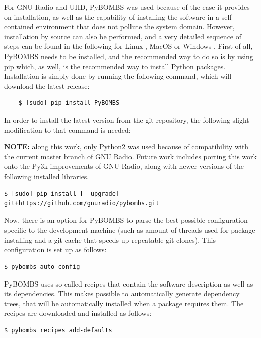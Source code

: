 For GNU Radio and \ac{UHD}, \ac{PyBOMBS} was used because of the ease it provides on installation, as well as the capability of installing the software in a self-contained environment that does not pollute the system domain. However, installation by source can also be performed, and a very detailed sequence of steps can be found in the following for Linux \cite{Linux}, MacOS \cite{OSX} or Windows \cite{Windows}. First of all, \ac{PyBOMBS} needs to be installed, and the recommended way to do so is by using \ac{pip} which, as well, is the recommended way to install Python packages.  Installation is simply done by running the following command, which will download the latest release:

\begin{lstlisting}
    $ [sudo] pip install PyBOMBS
\end{lstlisting}

In order to install the latest version from the git repository, the following slight modification to that command is needed:

\textbf{NOTE:} along this work, only Python2 was used because of compatibility with the current master branch of GNU Radio. Future work includes porting this work onto the Py3k improvements of GNU Radio, along with newer versions of the following installed libraries.

\begin{lstlisting}[breaklines=true]
    $ [sudo] pip install [--upgrade] git+https://github.com/gnuradio/pybombs.git
\end{lstlisting}

Now, there is an option for \ac{PyBOMBS} to parse the best possible configuration specific to the development machine (such as amount of threads used for package installing and a git-cache that speeds up repeatable git clones). This configuration is set up as follows:

\begin{lstlisting}[breaklines=true]
    $ pybombs auto-config
\end{lstlisting}

\ac{PyBOMBS} uses so-called recipes that contain the software description as well as its dependencies. This makes possible to automatically generate dependency trees, that will be automatically installed when a package requires them. The recipes are downloaded and installed as follows:

\begin{lstlisting}[breaklines=true]
    $ pybombs recipes add-defaults
\end{lstlisting}

